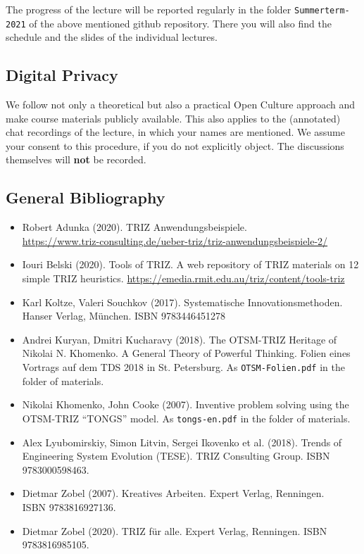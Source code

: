 \documentclass[11pt,a4paper]{article}
\begin{document}
The progress of the lecture will be reported regularly in the folder
\texttt{Summerterm-2021} of the above mentioned github repository. There you
will also find the schedule and the slides of the individual lectures.

\subsection{Digital Privacy}

We follow not only a theoretical but also a practical Open Culture approach
and make course materials publicly available.  This also applies to the
(annotated) chat recordings of the lecture, in which your names are mentioned.
We assume your consent to this procedure, if you do not explicitly object.
The discussions themselves will \textbf{not} be recorded.

\subsection{General Bibliography}

\begin{itemize}[noitemsep]
\item Robert Adunka (2020). TRIZ Anwendungsbeispiele. \\
  \url{https://www.triz-consulting.de/ueber-triz/triz-anwendungsbeispiele-2/} 
\item Iouri Belski (2020). Tools of TRIZ. A web repository of TRIZ materials
  on 12 simple TRIZ heuristics.
  \url{https://emedia.rmit.edu.au/triz/content/tools-triz}
\item Karl Koltze, Valeri Souchkov (2017). Systematische Innovationsmethoden.
  Hanser Verlag, München. ISBN 9783446451278
\item Andrei Kuryan, Dmitri Kucharavy (2018). The OTSM-TRIZ Heritage of
  Nikolai N. Khomenko. A General Theory of Powerful Thinking. Folien eines
  Vortrags auf dem TDS 2018 in St. Petersburg. As \texttt{OTSM-Folien.pdf} in
  the folder of materials.
\item Nikolai Khomenko, John Cooke (2007). Inventive problem solving using the
  OTSM-TRIZ “TONGS” model.  As \texttt{tongs-en.pdf} in the folder of
  materials.
\item Alex Lyubomirskiy, Simon Litvin, Sergei Ikovenko et al. (2018). Trends
  of Engineering System Evolution (TESE).  TRIZ Consulting Group. ISBN
  9783000598463.
\item Dietmar Zobel (2007). Kreatives Arbeiten. Expert Verlag, Renningen.\\
  ISBN 9783816927136.
\item Dietmar Zobel (2020). TRIZ für alle. Expert Verlag, Renningen. ISBN
  9783816985105.
\end{itemize}
\end{document}
